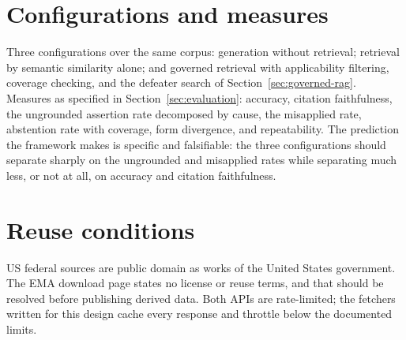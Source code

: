 \section{Configurations and measures}

Three configurations over the same corpus: generation without retrieval; retrieval by
semantic similarity alone; and governed retrieval with applicability filtering, coverage
checking, and the defeater search of Section~\ref{sec:governed-rag}. Measures as
specified in Section~\ref{sec:evaluation}: accuracy, citation faithfulness, the
ungrounded assertion rate decomposed by cause, the misapplied rate, abstention rate with
coverage, form divergence, and repeatability. The prediction the framework makes is
specific and falsifiable: the three configurations should separate sharply on the
ungrounded and misapplied rates while separating much less, or not at all, on accuracy
and citation faithfulness.

\section{Reuse conditions}

US federal sources are public domain as works of the United States government. The EMA
download page states no license or reuse terms, and that should be resolved before
publishing derived data. Both APIs are rate-limited; the fetchers written for this design
cache every response and throttle below the documented limits.
